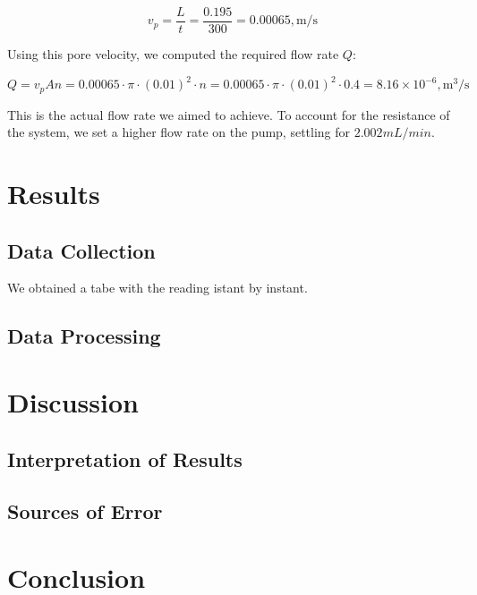 \begin{equation}
v_p = \frac{L}{t} = \frac{0.195}{300} = 0.00065 , \text{m/s}
\end{equation}

Using this pore velocity, we computed the required flow rate $Q$:

\begin{equation}
Q = v_p An = 0.00065 \cdot \pi \cdot (0.01)^2 \cdot n = 0.00065 \cdot \pi \cdot (0.01)^2 \cdot 0.4 = 8.16 \times 10^{-6} , \text{m}^3/\text{s}
\end{equation}

This is the actual flow rate we aimed to achieve. To account for the resistance of the system, 
we set a higher flow rate on the pump, settling for $2.002 mL/min$.

\section{Results}

\subsection{Data Collection}
We obtained a tabe with the reading istant by instant.
\subsection{Data Processing}

\section{Discussion}

\subsection{Interpretation of Results}

\subsection{Sources of Error}

\section{Conclusion}
